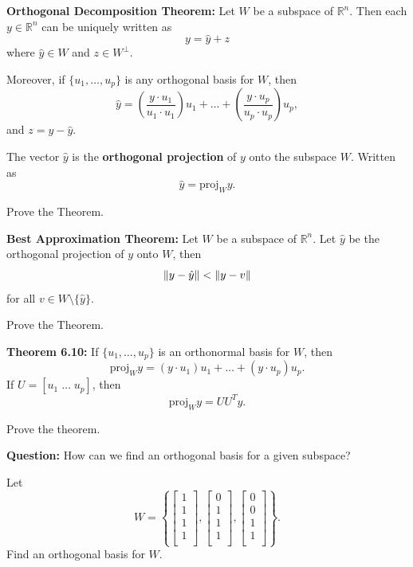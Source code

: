 \newpage

{\bf Orthogonal Decomposition Theorem:} Let $W$ be a subspace of $\mathbb{R}^n$. Then each $y \in \mathbb{R}^n$ can be uniquely written as $$y=\hat{y} + z$$ where $\hat{y} \in W$ and $z \in W^{\perp}$. 

Moreover, if $\{u_1, \dots, u_p\}$ is any orthogonal basis for $W$, then $$\hat{y}= \left(\frac{y \cdot u_1}{u_1 \cdot u_1} \right)u_1+\dots+  \left(\frac{y \cdot u_p}{u_p \cdot u_p} \right)u_p,$$ and $z=y-\hat{y}$.


\begin{defn} The vector $\hat{y}$ is the {\bf orthogonal projection} of $y$ onto the subspace $W$. Written as $$\hat{y}=\text{proj}_{W}{y}.$$
\end{defn} 

\begin{enumerate}

\Problem Prove the Theorem.

\vfill

{\bf Best Approximation Theorem:} Let $W$ be a subspace of $\mathbb{R}^n$. Let $\hat{y}$ be the orthogonal projection of $y$ onto $W$, then $$\left\lVert y-\hat{y}\right\rVert < \left\lVert y-v\right\rVert$$ for all $v\in W \setminus \{\hat{y}\}$.

\Problem Prove the Theorem.

\vfill

\newpage

{\bf Theorem 6.10:} If $\{ u_1, \dots, u_p\}$ is an orthonormal basis for $W$, then $$\text{proj}_{W}{y} =(y\cdot u_1) u_1 +\dots +(y \cdot u_p) u_p.$$ If $U=[u_1 \; \dots \; u_p]$, then $$\text{proj}_{W}{y} =U U^{T} y.$$ 

\Problem Prove the theorem.

\newpage


{\bf Question:} How can we find an orthogonal basis for a given subspace?


\Problem Let $$W=\left\{\begin{bmatrix}1\\ 1\\ 1\\ 1\\ \end{bmatrix}, \begin{bmatrix}0\\ 1\\ 1\\ 1\\ \end{bmatrix} ,\begin{bmatrix}0\\ 0\\ 1\\ 1\\ \end{bmatrix}\right\}.$$ Find an orthogonal basis for $W$.


\end{enumerate}
